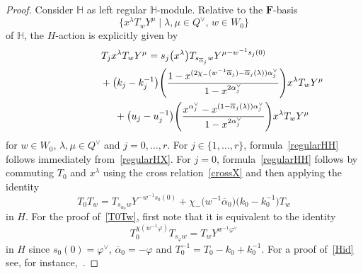 \documentclass[11pt]{article}
\numberwithin{equation}{section}
\numberwithin{equation}{section}
\begin{document}
\begin{proof}
Consider $\mathbb{H}$ as left regular $\mathbb{H}$-module.
Relative
to the $\mathbf{F}$-basis
\[
\bigl\{x^\lambda T_w Y^\mu\mid \lambda,\mu\in Q^\vee,\, w\in W_0\bigr\}
\]
of $\mathbb{H}$, the $H$-action is explicitly given by
\begin{gather}
T_jx^\lambda T_wY^\mu=s_j\bigl(x^\lambda\bigr)T_{s_{\overline{\alpha}_j}w}Y^{\mu-w^{-1}s_j(0)} \nonumber\\
\hphantom{T_jx^\lambda T_wY^\mu=}{}
+\big(k_j-k_j^{-1}\big)\Biggl(\frac{1-x^{(2\chi_-(w^{-1}\overline{\alpha}_j)-\overline{\alpha}_j(\lambda))\alpha_j^\vee}}{1-x^{2\alpha_j^\vee}}\Biggr)x^\lambda T_wY^\mu\nonumber\\
\hphantom{T_jx^\lambda T_wY^\mu=}{}
+\big(u_j-u_j^{-1}\big)\Biggl(\frac{x^{\alpha_j^\vee}-x^{(1-\overline{\alpha}_j(\lambda))\alpha_j^\vee}}{1-x^{2\alpha_j^\vee}}\Biggr)x^\lambda T_w Y^\mu\label{regularHH}
\end{gather}
for $w\in W_0$, $\lambda,\mu\in Q^\vee$ and $j=0,\dots,r$. For $j\in\{1,\dots,r\}$, formula~\eqref{regularHH} follows immediately from~\eqref{regularHX}.
For $j=0$, formula~\eqref{regularHH} follows by commuting $T_0$ and $x^\lambda$ using the cross relation~\eqref{crossX} and then applying
the identity
\begin{equation}\label{T0Tw}
T_0T_w=T_{s_{\overline{\alpha}_0}w}Y^{-w^{-1}s_0(0)}+\chi_-\bigl(w^{-1}\overline{\alpha}_0\bigr)\bigl(k_0-k_0^{-1}\bigr)T_w
\end{equation}
in $H$. For the proof of~\eqref{T0Tw}, first note that it is equivalent to the identity
\begin{equation}\label{Hid}
T_0^{\chi(w^{-1}\varphi)}T_{s_\varphi w}=T_wY^{w^{-1}\varphi^\vee}
\end{equation}
in $H$ since $s_0(0)=\varphi^\vee$, $\overline{\alpha}_0=-\varphi$ and $T_0^{-1}=T_0-k_0+k_0^{-1}$.
For a proof of~\eqref{Hid} see, for instance,~\cite[(3.3.6)]{Ma}.


\end{proof}
\end{document}
